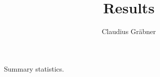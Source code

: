 \documentclass[11pt,a4paper]{article}
\author{Claudius Gr\"abner}
\title{Results}
\begin{document}
\begin{table}
\begin{center}

\end{center}
\caption{Summary statistics.}
\end{table}
\end{document}
